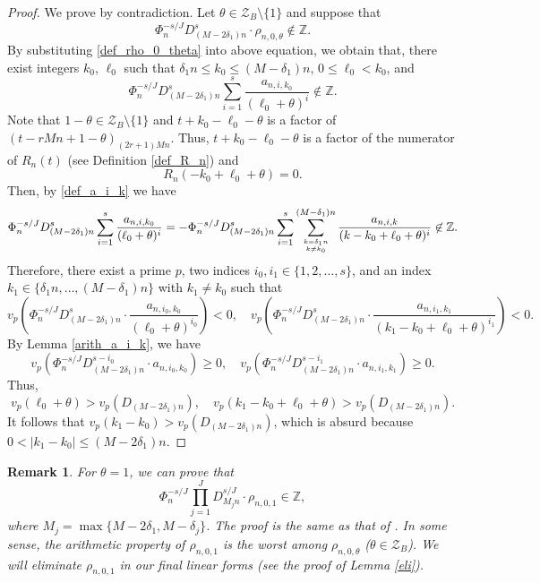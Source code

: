\documentclass[12pt]{article}
\newtheorem{remark}[theorem]{Remark}
\numberwithin{equation}{section}
\begin{document}
\begin{proof}
We prove by contradiction. Let $\theta \in \mathcal{Z}_B \setminus \{1\}$ and suppose that 
\[ \Phi_n^{-s/J} D_{(M-2\delta_1)n}^{s} \cdot  \rho_{n,0,\theta} \not\in \mathbb{Z}. \]
By substituting \eqref{def_rho_0_theta} into above equation, we obtain that, there exist integers $k_0$, $\ell_0$ such that $\delta_1 n \leqslant k_0 \leqslant (M-\delta_1)n$, $0 \leqslant \ell_0 < k_0$, and
\[ \Phi_n^{-s/J} D_{(M-2\delta_1)n}^{s}  \sum_{i=1}^{s} \frac{a_{n,i,k_0}}{(\ell_0+\theta)^i} \not\in \mathbb{Z}.  \] 
Note that $1 - \theta \in \mathcal{Z}_B \setminus \{ 1 \}$ and $t+k_0-\ell_0-\theta$ is a factor of $(t-rMn+1-\theta)_{(2r+1)Mn}$. Thus, $t+k_0-\ell_0-\theta$ is a factor of the numerator of $R_n(t)$ (see Definition \ref{def_R_n}) and
\[ R_n(-k_0+\ell_0 + \theta) = 0. \]
Then, by \eqref{def_a_i_k} we have
\[ \Phi_n^{-s/J} D_{(M-2\delta_1)n}^{s}  \sum_{i=1}^{s} \frac{a_{n,i,k_0}}{(\ell_0+\theta)^i} =  - \Phi_n^{-s/J} D_{(M-2\delta_1)n}^{s}  \sum_{i=1}^{s}\sum_{k = \delta_1 n \atop k \neq k_0}^{(M-\delta_1)n} \frac{a_{n,i,k}}{(k-k_0+\ell_0+\theta)^i} \not\in \mathbb{Z}. \]
Therefore, there exist a prime $p$, two indices $i_0,i_1 \in \{1,2,\ldots,s\}$, and an index $k_1 \in \{ \delta_1 n, \ldots, (M-\delta_1)n \}$ with $k_1 \neq k_0$ such that
\[ v_p\left( \Phi_n^{-s/J} D_{(M-2\delta_1)n}^{s} \cdot \frac{a_{n,i_0,k_0}}{(\ell_0+\theta)^{i_0}} \right) < 0, \quad  v_p\left( \Phi_n^{-s/J} D_{(M-2\delta_1)n}^{s} \cdot \frac{a_{n,i_1,k_1}}{(k_1-k_0+\ell_0+\theta)^{i_1}} \right) < 0. \]
By Lemma \ref{arith_a_i_k}, we have 
\[ v_p\left( \Phi_n^{-s/J} D_{(M-2\delta_1)n}^{s-i_0} \cdot a_{n,i_0,k_0}\right) \geqslant 0, \quad v_p\left( \Phi_n^{-s/J} D_{(M-2\delta_1)n}^{s-i_1} \cdot a_{n,i_1,k_1}\right) \geqslant 0. \]
Thus,
\[ v_p\left( \ell_0 + \theta \right) > v_p(D_{(M-2\delta_1)n}), \quad v_p\left( k_1 - k_0 + \ell_0 + \theta \right) > v_p(D_{(M-2\delta_1)n}). \]
It follows that $v_p(k_1-k_0) > v_p(D_{(M-2\delta_1)n})$, which is absurd because $0 < |k_1-k_0| \leqslant (M-2\delta_1)n$. 
\end{proof}

\medskip

\begin{remark}
For $\theta = 1$, we can prove that
\[ \Phi_n^{-s/J} \prod_{j=1}^{J} D_{M_j n}^{s/J} \cdot  \rho_{n,0,1} \in \mathbb{Z}, \]
where $M_j = \max\{ M-2\delta_1, M-\delta_j \}$. The proof is the same as that of \cite[Lem. 4.4]{Lai2024+}. In some sense, the arithmetic property of $\rho_{n,0,1}$ is the worst among $\rho_{n,0,\theta}$ ($\theta \in \mathcal{Z}_B$). We will eliminate $\rho_{n,0,1}$ in our final linear forms (see the proof of Lemma \ref{eli}). 
\end{remark}
\end{document}
